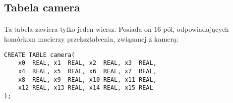 \subsection{Tabela camera}

\paragraph{}
Ta tabela zawiera tylko jeden wiersz. Posiada on 16 pól, odpowiadających komórkom macierzy przekształcenia, związanej z kamerą:
\begin{verbatim}
CREATE TABLE camera(
    x0  REAL, x1  REAL, x2  REAL, x3  REAL,
    x4  REAL, x5  REAL, x6  REAL, x7  REAL,
    x8  REAL, x9  REAL, x10 REAL, x11 REAL,
    x12 REAL, x13 REAL, x14 REAL, x15 REAL
);
\end{verbatim}
